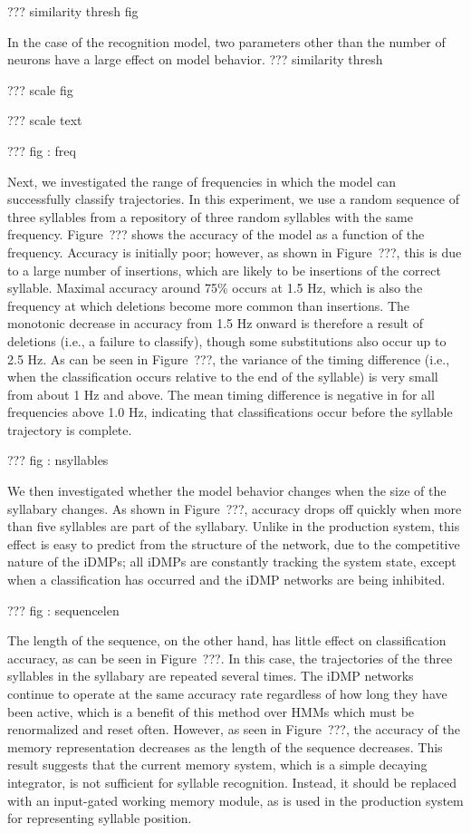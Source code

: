 ??? similarity thresh fig

In the case of the recognition model,
two parameters other than the number of neurons
have a large effect on model behavior.
??? similarity thresh

??? scale fig

??? scale text

??? fig : freq

Next, we investigated the
range of frequencies in which the model
can successfully classify trajectories.
In this experiment, we use a random sequence
of three syllables from a
repository of three random syllables
with the same frequency.
Figure~??? shows the accuracy
of the model as a function of the frequency.
Accuracy is initially poor;
however, as shown in Figure~???,
this is due to a large number
of insertions,
which are likely to be insertions
of the correct syllable.
Maximal accuracy around 75\%
occurs at 1.5 Hz,
which is also the frequency at which
deletions become more common
than insertions.
The monotonic decrease in accuracy
from 1.5 Hz onward
is therefore a result of deletions
(i.e., a failure to classify),
though some substitutions also occur
up to 2.5 Hz.
As can be seen in Figure~???,
the variance of the timing difference
(i.e., when the classification occurs
relative to the end of the syllable)
is very small from about 1 Hz and above.
The mean timing difference
is negative in for all frequencies
above 1.0 Hz,
indicating that classifications
occur before the syllable trajectory
is complete.

??? fig : nsyllables

We then investigated whether the model
behavior changes when the size
of the syllabary changes.
As shown in Figure~???,
accuracy drops off quickly when
more than five syllables
are part of the syllabary.
Unlike in the production system,
this effect is easy to predict
from the structure of the network,
due to the competitive nature
of the iDMPs;
all iDMPs are constantly tracking
the system state,
except when a classification has occurred
and the iDMP networks are being inhibited.

??? fig : sequencelen

The length of the sequence,
on the other hand,
has little effect on classification accuracy,
as can be seen in Figure~???.
In this case, the trajectories
of the three syllables in the syllabary
are repeated several times.
The iDMP networks continue to operate
at the same accuracy rate
regardless of how long they have been active,
which is a benefit of this method
over HMMs which must be renormalized
and reset often.
However, as seen in Figure~???,
the accuracy of the memory representation
decreases as the length of the sequence decreases.
This result suggests that
the current memory system,
which is a simple decaying integrator,
is not sufficient for syllable recognition.
Instead, it should be replaced with
an input-gated working memory module,
as is used in the production system
for representing syllable position.

